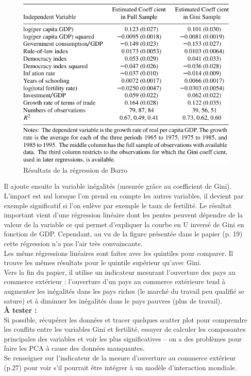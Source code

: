 \documentclass[11pt,a4paper]{article}
\begin{document}
\begin{figure}[h!]
\begin{center}
\includegraphics[scale=0.8]{barro_growth_results.pdf}
\caption{Résultats de la régression de Barro}
\label{barro_growth_results}
\end{center}
\end{figure}

Il ajoute ensuite la variable inégalités (mesurée grâce au coefficient de Gini). L'impact est nul lorsque l'on prend en compte les autres variables, il devient par exemple significatif si l'on enlève par exemple le taux de fertilité. Le résultat important vient d'une régression linéaire dont les pentes peuvent dépendre de la valeur de la variable ce qui permet d'expliquer la courbe en U inversé de Gini en fonction de GDP. Cependant, au vu de la figure présentée dans le papier (p. 19) cette régression n'a pas l'air très convaincante. \\

Les même régressions linéaires sont faites avec les quintiles pour comparer. Il trouve les mêmes résultats pour le quintile supérieur qu'avec Gini. \\
Vers la fin du papier, il utilise un indicateur mesurant l'ouverture des pays au commerce extérieur : l'ouverture d'un pays au commerce extérieure tend à augmenter les inégalités dans les pays riches (le marché du travail peu qualifié se sature) et à diminuer les inégalités dans le pays pauvres (plus de travail). \\

\noindent
\textbf{\`A tester :} \\
Si possible, récupérer les données et tracer quelques scatter plot
pour comprendre les conflits entre les variables Gini et fertilité, essayer de calculer les composantes principales des variables et voir les plus significatives -- on a des problèmes pour faire les PCA à cause des données manquantes. \\
Se renseigner sur l'indicateur de la mesure d'ouverture au commerce extérieur (p.27) pour voir s'il pourrait être intégrer à un modèle d'interaction mondiale. 
\end{document}
